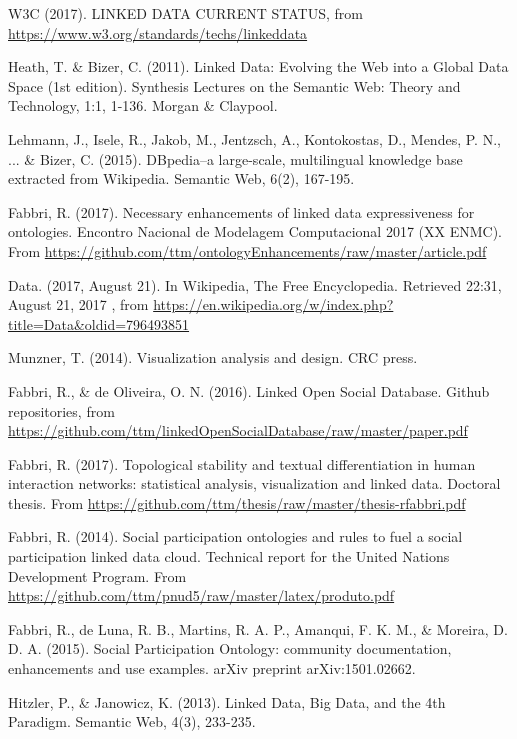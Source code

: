 \documentclass[12pt,fleqn]{article}
\begin{document}
\begin{thebibliography}{99}
\fontsize{11}{0}\selectfont
{}
	W3C (2017). LINKED DATA CURRENT STATUS, from \url{https://www.w3.org/standards/techs/linkeddata}

	Heath, T. \& Bizer, C. (2011). Linked Data: Evolving the Web into a Global Data Space (1st edition). Synthesis Lectures on the Semantic Web: Theory and Technology, 1:1, 1-136. Morgan \& Claypool.

	Lehmann, J., Isele, R., Jakob, M., Jentzsch, A., Kontokostas, D., Mendes, P. N., ... \& Bizer, C. (2015). DBpedia–a large-scale, multilingual knowledge base extracted from Wikipedia. Semantic Web, 6(2), 167-195.

	Fabbri, R. (2017). Necessary enhancements of linked data expressiveness for ontologies.
		Encontro Nacional de Modelagem Computacional 2017 (XX ENMC).
		From \url{https://github.com/ttm/ontologyEnhancements/raw/master/article.pdf}

	Data. (2017, August 21). In Wikipedia, The Free Encyclopedia. Retrieved
		22:31, August 21, 2017
		, from \url{https://en.wikipedia.org/w/index.php?title=Data&oldid=796493851}

	Munzner, T. (2014). Visualization analysis and design. CRC press.

	Fabbri, R., \& de Oliveira, O. N. (2016). Linked Open Social Database. Github repositories, from \url{https://github.com/ttm/linkedOpenSocialDatabase/raw/master/paper.pdf}

Fabbri, R. (2017). Topological stability and textual differentiation in human interaction networks:
		statistical analysis, visualization and linked data. Doctoral thesis.
		From \url{https://github.com/ttm/thesis/raw/master/thesis-rfabbri.pdf}

Fabbri, R. (2014). Social participation ontologies and rules to fuel a social participation linked data cloud.
	Technical report for the United Nations Development Program.
		From \url{https://github.com/ttm/pnud5/raw/master/latex/produto.pdf}

Fabbri, R., de Luna, R. B., Martins, R. A. P., Amanqui, F. K. M., \& Moreira, D. D. A. (2015). Social Participation Ontology: community documentation, enhancements and use examples. arXiv preprint arXiv:1501.02662.

Hitzler, P., \& Janowicz, K. (2013). Linked Data, Big Data, and the 4th Paradigm. Semantic Web, 4(3), 233-235.

\end{thebibliography}
\end{document}

